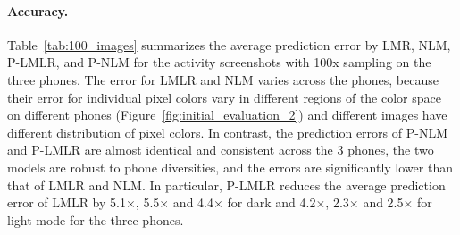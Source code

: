\paragraph{Accuracy.}
Table~\ref{tab:100_images}
summarizes the average prediction error by LMR, NLM, P-LMLR, and P-NLM
for the activity screenshots with 100x sampling on the three phones.
The error for LMLR and NLM varies across the phones,
because their error for individual pixel colors vary in different regions of the color space
on different phones (Figure~\ref{fig:initial_evaluation_2})
and different images have different distribution of pixel colors.
In contrast, the prediction errors of P-NLM and P-LMLR are
almost identical and consistent across the 3 phones,
\ie the two models are robust to phone diversities,
and the errors are significantly lower than that of LMLR and NLM.
In particular, P-LMLR reduces the average prediction error
of LMLR by
    5.1$\times$, 5.5$\times$ and 4.4$\times$ for dark
    and 4.2$\times$, 2.3$\times$ and 2.5$\times$ for light mode for the three phones.


